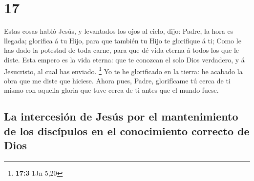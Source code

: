 \hypertarget{section-16}{%
\section{17}\label{section-16}}

 Estas cosas habló Jesús, y levantados los ojos al cielo,
dijo: Padre, la hora es llegada; glorifica á tu Hijo, para que también
tu Hijo te glorifique á ti;  Como le has dado la potestad de
toda carne, para que dé vida eterna á todos los que le diste.
 Esta empero es la vida eterna: que te conozcan el solo Dios
verdadero, y á Jesucristo, al cual has enviado. \footnote{\textbf{17:3}
  1Jn 5,20}  Yo te he glorificado en la tierra: he acabado
la obra que me diste que hiciese.  Ahora pues, Padre,
glorifícame tú cerca de ti mismo con aquella gloria que tuve cerca de ti
antes que el mundo fuese.

\hypertarget{la-intercesiuxf3n-de-jesuxfas-por-el-mantenimiento-de-los-discuxedpulos-en-el-conocimiento-correcto-de-dios}{%
\subsection{La intercesión de Jesús por el mantenimiento de los
discípulos en el conocimiento correcto de
Dios}\label{la-intercesiuxf3n-de-jesuxfas-por-el-mantenimiento-de-los-discuxedpulos-en-el-conocimiento-correcto-de-dios}}

